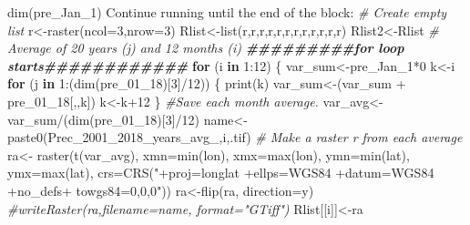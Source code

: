 \documentclass[
  10pt,
  b5paper,
]{book}
\newenvironment{Shaded}{\begin{snugshade}}{\end{snugshade}}
\newcommand{\AttributeTok}[1]{\textcolor[rgb]{0.77,0.63,0.00}{#1}}
\newcommand{\CommentTok}[1]{\textcolor[rgb]{0.56,0.35,0.01}{\textit{#1}}}
\newcommand{\ControlFlowTok}[1]{\textcolor[rgb]{0.13,0.29,0.53}{\textbf{#1}}}
\newcommand{\DecValTok}[1]{\textcolor[rgb]{0.00,0.00,0.81}{#1}}
\newcommand{\DocumentationTok}[1]{\textcolor[rgb]{0.56,0.35,0.01}{\textbf{\textit{#1}}}}
\newcommand{\FunctionTok}[1]{\textcolor[rgb]{0.00,0.00,0.00}{#1}}
\newcommand{\NormalTok}[1]{#1}
\newcommand{\OtherTok}[1]{\textcolor[rgb]{0.56,0.35,0.01}{#1}}
\newcommand{\SpecialCharTok}[1]{\textcolor[rgb]{0.00,0.00,0.00}{#1}}
\newcommand{\StringTok}[1]{\textcolor[rgb]{0.31,0.60,0.02}{#1}}
\begin{document}
\begin{Shaded}
\begin{Highlighting}[]
 \FunctionTok{dim}\NormalTok{(pre\_Jan\_1)  }
\NormalTok{ Continue running until the end of the block}\SpecialCharTok{:}
 \CommentTok{\# Create empty list}
\NormalTok{r}\OtherTok{\textless{}{-}}\FunctionTok{raster}\NormalTok{(}\AttributeTok{ncol=}\DecValTok{3}\NormalTok{,}\AttributeTok{nrow=}\DecValTok{3}\NormalTok{)}
\NormalTok{Rlist}\OtherTok{\textless{}{-}}\FunctionTok{list}\NormalTok{(r,r,r,r,r,r,r,r,r,r,r,r)}
\NormalTok{Rlist2}\OtherTok{\textless{}{-}}\NormalTok{Rlist}
 \CommentTok{\# Average of 20 years (j)  and 12 months (i) }
\DocumentationTok{\#\#\#\#\#\#\#\#\#for loop starts\#\#\#\#\#\#\#\#\#\#\#\#}
 \ControlFlowTok{for}\NormalTok{ (i }\ControlFlowTok{in} \DecValTok{1}\SpecialCharTok{:}\DecValTok{12}\NormalTok{) \{ }
\NormalTok{var\_sum}\OtherTok{\textless{}{-}}\NormalTok{pre\_Jan\_1}\SpecialCharTok{*}\DecValTok{0}
\NormalTok{k}\OtherTok{\textless{}{-}}\NormalTok{i}
 \ControlFlowTok{for}\NormalTok{ (j }\ControlFlowTok{in} \DecValTok{1}\SpecialCharTok{:}\NormalTok{(}\FunctionTok{dim}\NormalTok{(pre\_01\_18)[}\DecValTok{3}\NormalTok{]}\SpecialCharTok{/}\DecValTok{12}\NormalTok{)) \{}
\FunctionTok{print}\NormalTok{(k)}
\NormalTok{var\_sum}\OtherTok{\textless{}{-}}\NormalTok{(var\_sum }\SpecialCharTok{+}\NormalTok{ pre\_01\_18[,,k])}
\NormalTok{ k}\OtherTok{\textless{}{-}}\NormalTok{k}\SpecialCharTok{+}\DecValTok{12}
\NormalTok{ \}}
\CommentTok{\#Save each month average. }
\NormalTok{ var\_avg}\OtherTok{\textless{}{-}}\NormalTok{var\_sum}\SpecialCharTok{/}\NormalTok{(}\FunctionTok{dim}\NormalTok{(pre\_01\_18)[}\DecValTok{3}\NormalTok{]}\SpecialCharTok{/}\DecValTok{12}\NormalTok{)}
\NormalTok{ name}\OtherTok{\textless{}{-}}\FunctionTok{paste0}\NormalTok{(}\StringTok{\textquotesingle{}Prec\_2001\_2018\_years\_avg\_\textquotesingle{}}\NormalTok{,i,}\StringTok{\textquotesingle{}.tif\textquotesingle{}}\NormalTok{)}
 \CommentTok{\# Make a raster r from  each average}
\NormalTok{ra}\OtherTok{\textless{}{-}} \FunctionTok{raster}\NormalTok{(}\FunctionTok{t}\NormalTok{(var\_avg), }\AttributeTok{xmn=}\FunctionTok{min}\NormalTok{(lon), }\AttributeTok{xmx=}\FunctionTok{max}\NormalTok{(lon), }\AttributeTok{ymn=}\FunctionTok{min}\NormalTok{(lat), }\AttributeTok{ymx=}\FunctionTok{max}\NormalTok{(lat), }\AttributeTok{crs=}\FunctionTok{CRS}\NormalTok{(}\StringTok{"+proj=longlat +ellps=WGS84 +datum=WGS84 +no\_defs+ towgs84=0,0,0"}\NormalTok{))}
\NormalTok{ra}\OtherTok{\textless{}{-}}\FunctionTok{flip}\NormalTok{(ra, }\AttributeTok{direction=}\StringTok{\textquotesingle{}y\textquotesingle{}}\NormalTok{)}
\CommentTok{\#writeRaster(ra,filename=name, format="GTiff")}
\NormalTok{Rlist[[i]]}\OtherTok{\textless{}{-}}\NormalTok{ra}

\end{Highlighting}
\end{Shaded}
\end{document}
